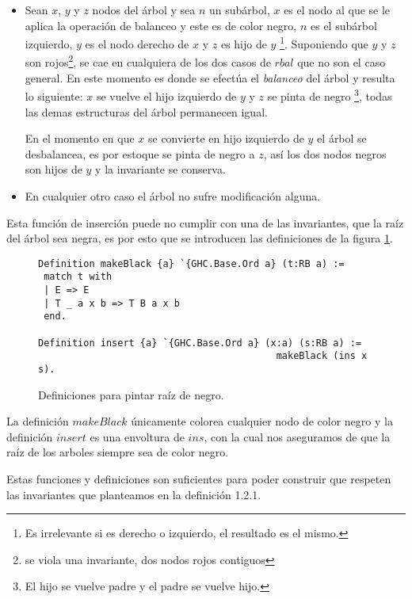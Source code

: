 \begin{itemize}
    \item Sean $x$, $y$ y $z$ nodos del \'arbol y sea $n$ un subárbol, $x$ es el nodo al que se le
    aplica la operaci\'on de balanceo y este es de color negro, $n$ es el subárbol izquierdo, $y$
    es el nodo derecho de $x$ y $z$ es hijo de $y$ \footnote{Es irrelevante si es derecho o
    izquierdo, el resultado es el mismo.}. Suponiendo que $y$ y $z$ son rojos\footnote{se viola una
    invariante, dos nodos rojos contiguos}, se cae en cualquiera de los dos casos de $rbal$ que no
    son el caso general. En este momento es donde se efectúa el \textit{balanceo} del árbol y
    resulta lo siguiente: $x$ se vuelve el hijo izquierdo de $y$ y $z$ se pinta de negro
    \footnote{El hijo se vuelve padre y el padre se vuelve hijo.}, todas las demas estructuras del
    \'arbol permanecen igual.

    En el momento en que $x$ se convierte en hijo izquierdo de $y$ el \'arbol se desbalancea, es
    por estoque se pinta de negro a $z$, así los dos nodos negros son hijos de $y$ y la invariante
    se conserva.
    \item En cualquier otro caso el \'arbol no sufre modificaci\'on alguna.
\end{itemize}

Esta función de inserción puede no cumplir con una de las invariantes, que la raíz del árbol sea
negra, es por esto que se introducen las definiciones de la figura \ref{raiz_negra_func}.

\begin{figure}
\centering
\captionsetup{justification=centering}
\begin{verbatim}
Definition makeBlack {a} `{GHC.Base.Ord a} (t:RB a) :=
 match t with
 | E => E
 | T _ a x b => T B a x b
 end.

Definition insert {a} `{GHC.Base.Ord a} (x:a) (s:RB a) :=
                                          makeBlack (ins x s).
\end{verbatim}
\caption{Definiciones para pintar ra\'iz de negro.}
\label{raiz_negra_func}
\end{figure}

La definici\'on $makeBlack$ únicamente colorea cualquier nodo de color negro y la definición
$insert$ es una envoltura de $ins$, con la cual nos aseguramos de que la ra\'iz de los arboles
siempre sea de color negro.

Estas funciones y definiciones son suficientes para poder construir {\arns} que respeten las
invariantes que planteamos en la definici\'on 1.2.1.

